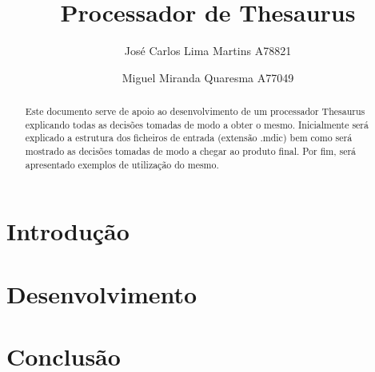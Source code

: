 \documentclass{llncs}
\begin{document}
\mainmatter
\title{Processador de Thesaurus}
\author{José Carlos Lima Martins A78821 \and
        Miguel Miranda Quaresma A77049}

\maketitle

\justify

\begin{abstract}
Este documento serve de apoio ao desenvolvimento de um processador Thesaurus explicando todas as decisões tomadas de modo a obter o mesmo. Inicialmente será explicado a estrutura dos ficheiros de entrada (extensão .mdic) bem como será mostrado as decisões tomadas de modo a chegar ao produto final. Por fim, será apresentado exemplos de utilização do mesmo.
\end{abstract}

\section{Introdução}

\section{Desenvolvimento}

\section{Conclusão}
\end{document}
